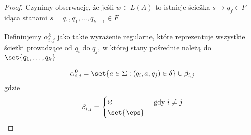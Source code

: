 \begin{proof}
    Czynimy obserwację, że jeśli \( w \in L(A) \) to istnieje ścieżka \( s \rightarrow q_f \in F \) idąca stanami \( s = q_1, q_1, \dots, q_{k+1} \in F \)
    
    Definiujemy \( \alpha_{i, j}^k \) jako takie wyrażenie regularne, które reprezentuje wszystkie ścieżki prowadzące od \( q_i \) do \( q_j \), w której stany pośrednie należą do \( \set{q_1, \dots, q_k} \)
    
    \[
        \alpha_{i, j}^0 = \set{a \in \Sigma : (q_i, a, q_j) \in \delta } \cup \beta_{i, j}
    \]
    gdzie
    \[
        \beta_{i, j} = \begin{cases}
            \varnothing & \text{ gdy } i \neq j \\
            \set{\eps}
        \end{cases}
    \]
\end{proof}